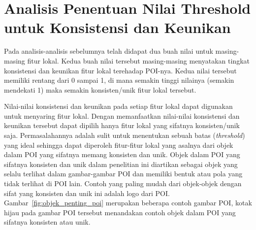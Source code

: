 %
%
%

\section{Analisis Penentuan Nilai Threshold untuk Konsistensi dan Keunikan}
Pada analisis-analisis sebelumnya telah didapat dua buah nilai untuk masing-masing fitur lokal. Kedua buah nilai tersebut masing-masing menyatakan tingkat konsistensi dan keunikan fitur lokal terehadap POI-nya. Kedua nilai tersebut memiliki rentang dari 0 sampai 1, di mana semakin tinggi nilainya (semakin mendekati 1) maka semakin konsisten/unik fitur lokal tersebut. 

Nilai-nilai konsistensi dan keunikan pada setiap fitur lokal dapat digunakan untuk menyaring fitur lokal. Dengan memanfaatkan nilai-nilai konsistensi dan keunikan tersebut dapat dipilih hanya fitur lokal yang sifatnya konsisten/unik saja. Permasalahannya adalah sulit untuk menentukan sebuah batas (\textit{threshold}) yang ideal sehingga dapat diperoleh fitur-fitur lokal yang asalnya dari objek dalam POI yang sifatnya memang konsisten dan unik. Objek dalam POI yang sifatnya konsisten dan unik dalam penelitian ini diartikan sebagai objek yang selalu terlihat dalam gambar-gambar POI dan memiliki bentuk atau pola yang tidak terlihat di POI lain. Contoh yang paling mudah dari objek-objek dengan sifat yang konsisten dan unik ini adalah logo dari POI. Gambar~\ref{fig:objek_penting_poi} merupakan beberapa contoh gambar POI, kotak hijau pada gambar POI tersebut menandakan contoh objek dalam POI yang sifatnya konsisten atau unik.

